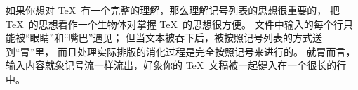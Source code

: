\danger 如果你想对 \TeX\ 有一个完整的理解，那么理解记号列表的思想很重要的，
把 \TeX\ 的思想看作一个生物体对掌握 \TeX\ 的思想很方便。%
文件中输入的每个行只能被``眼睛''和``嘴巴''遇见；
但当文本被吞下后，被按照记号列表的方式送到``胃''里，
而且处理实际排版的消化过程是完全按照记号来进行的。%
就胃而言，输入内容就象记号流一样流出，好象你的 \TeX\ 文稿被一起键入在一个很长的行中。

